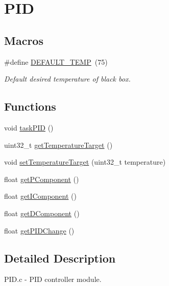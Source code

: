 \hypertarget{group___p_i_d}{}\section{P\+ID}
\label{group___p_i_d}
\subsection*{Macros}
\begin{DoxyCompactItemize}
\item 
\#define \hyperlink{group___p_i_d_ga8ad7dae0db3f1e99cd31a5ab75aaaf67}{D\+E\+F\+A\+U\+L\+T\+\_\+\+T\+E\+MP}~(75)\hypertarget{group___p_i_d_ga8ad7dae0db3f1e99cd31a5ab75aaaf67}{}\label{group___p_i_d_ga8ad7dae0db3f1e99cd31a5ab75aaaf67}

\begin{DoxyCompactList}\small\item\em Default desired temperature of black box. \end{DoxyCompactList}\end{DoxyCompactItemize}
\subsection*{Functions}
\begin{DoxyCompactItemize}
\item 
void \hyperlink{group___p_i_d_ga2da744d736fb7d62aabcabf123a6a73e}{task\+P\+ID} ()
\item 
uint32\+\_\+t \hyperlink{group___p_i_d_gad81dd2cc227ebb576a249612dcd6eb7d}{get\+Temperature\+Target} ()
\item 
void \hyperlink{group___p_i_d_ga5af428ce00f41361a218592fee843315}{set\+Temperature\+Target} (uint32\+\_\+t temperature)
\item 
float \hyperlink{group___p_i_d_gabbaa1e313335edc4c0f70348b7982db5}{get\+P\+Component} ()
\item 
float \hyperlink{group___p_i_d_gaa0469898df39f3825fab1b00a925d7b8}{get\+I\+Component} ()
\item 
float \hyperlink{group___p_i_d_gac2922b0fd1a0420148ca2a5f45a51783}{get\+D\+Component} ()
\item 
float \hyperlink{group___p_i_d_ga62096a430c86601ca8bed3fd5d07809b}{get\+P\+I\+D\+Change} ()
\end{DoxyCompactItemize}


\subsection{Detailed Description}
P\+I\+D.\+c -\/ P\+ID controller module.

